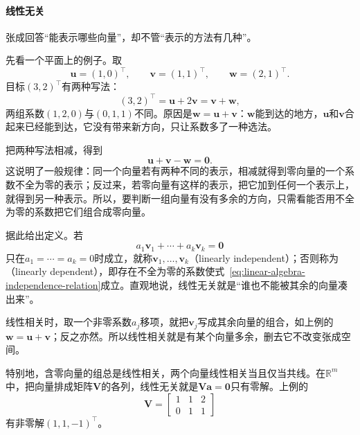 \paragraph{线性无关}
\label{sec:ls-linear-dependence}
张成回答“能表示哪些向量”，却不管“表示的方法有几种”。

先看一个平面上的例子。取
\[
 \bm u=(1,0)^\top,\qquad \bm v=(1,1)^\top,\qquad \bm w=(2,1)^\top .
\]
目标$(3,2)^\top$有两种写法：
\[
 (3,2)^\top=\bm u+2\bm v=\bm v+\bm w,
\]
两组系数$(1,2,0)$与$(0,1,1)$不同。原因是$\bm w=\bm u+\bm v$：$\bm w$能到达的地方，$\bm u$和$\bm v$合起来已经能到达，它没有带来新方向，只让系数多了一种选法。

把两种写法相减，得到
\[
 \bm u+\bm v-\bm w=\bm0 .
\]
这说明了一般规律：同一个向量若有两种不同的表示，相减就得到零向量的一个系数不全为零的表示；反过来，若零向量有这样的表示，把它加到任何一个表示上，就得到另一种表示。所以，要判断一组向量有没有多余的方向，只需看能否用不全为零的系数把它们组合成零向量。

据此给出定义。若
\begin{equation}
 a_1\bm v_1+\cdots+a_k\bm v_k=\bm0
 \label{eq:linear-algebra-independence-relation}
\end{equation}
只在$a_1=\cdots=a_k=0$时成立，就称$\bm v_1,\ldots,\bm v_k$（linearly independent）；否则称为（linearly dependent），即存在不全为零的系数使式~\eqref{eq:linear-algebra-independence-relation}成立。直观地说，线性无关就是“谁也不能被其余的向量凑出来”。

线性相关时，取一个非零系数$a_j$移项，就把$\bm v_j$写成其余向量的组合，如上例的$\bm w=\bm u+\bm v$；反之亦然。所以线性相关就是有某个向量多余，删去它不改变张成空间。

特别地，含零向量的组总是线性相关，两个向量线性相关当且仅当共线。在$\mathbb R^m$中，把向量排成矩阵$\bm V$的各列，线性无关就是$\bm V\bm a=\bm0$只有零解。上例的
\[
 \bm V=\begin{bmatrix}1&1&2\\0&1&1\end{bmatrix}
\]
有非零解$(1,1,-1)^\top$。

